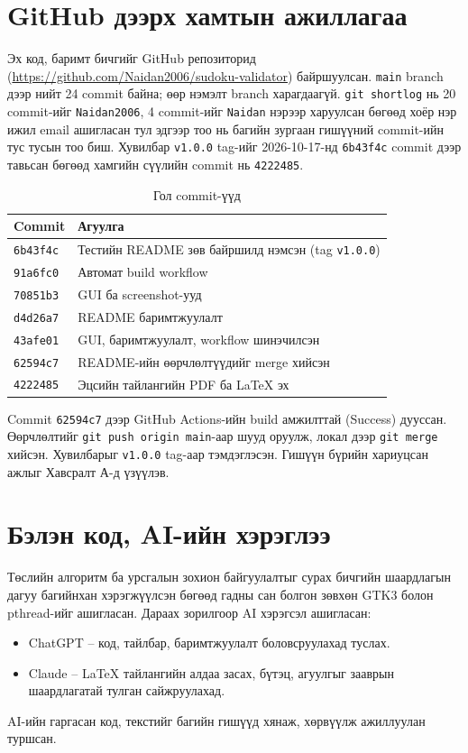 \documentclass[12pt,a4paper]{report}
\newcommand{\repo}{\url{https://github.com/Naidan2006/sudoku-validator}}
\begin{document}
\section{GitHub дээрх хамтын ажиллагаа}
Эх код, баримт бичгийг GitHub репозиторид (\repo) байршуулсан. \texttt{main} branch дээр нийт 24 commit байна; өөр нэмэлт branch харагдаагүй. \texttt{git shortlog} нь 20 commit-ийг \texttt{Naidan2006}, 4 commit-ийг \texttt{Naidan} нэрээр харуулсан бөгөөд хоёр нэр ижил email ашигласан тул эдгээр тоо нь багийн зургаан гишүүний commit-ийн тус тусын тоо биш. Хувилбар \texttt{v1.0.0} tag-ийг 2026-10-17-нд \texttt{6b43f4c} commit дээр тавьсан бөгөөд хамгийн сүүлийн commit нь \texttt{4222485}.
\begin{table}[H]\centering\caption{Гол commit-үүд}\begin{tabular}{P{0.2\textwidth}P{0.65\textwidth}}\toprule
\textbf{Commit}&\textbf{Агуулга}\\\midrule
\texttt{6b43f4c}&Тестийн README зөв байршилд нэмсэн (tag \texttt{v1.0.0})\\
\texttt{91a6fc0}&Автомат build workflow\\
\texttt{70851b3}&GUI ба screenshot-ууд\\
\texttt{d4d26a7}&README баримтжуулалт\\
\texttt{43afe01}&GUI, баримтжуулалт, workflow шинэчилсэн\\
\texttt{62594c7}&README-ийн өөрчлөлтүүдийг merge хийсэн\\
\texttt{4222485}&Эцсийн тайлангийн PDF ба LaTeX эх\\\bottomrule\end{tabular}\end{table}
Commit \texttt{62594c7} дээр GitHub Actions-ийн build амжилттай (Success) дууссан. Өөрчлөлтийг \texttt{git push origin main}-аар шууд оруулж, локал дээр \texttt{git merge} хийсэн. Хувилбарыг \texttt{v1.0.0} tag-аар тэмдэглэсэн. Гишүүн бүрийн хариуцсан ажлыг Хавсралт А-д үзүүлэв.
\section{Бэлэн код, AI-ийн хэрэглээ}
Төслийн алгоритм ба урсгалын зохион байгуулалтыг сурах бичгийн шаардлагын дагуу багийнхан хэрэгжүүлсэн бөгөөд гадны сан болгон зөвхөн GTK3 болон pthread-ийг ашигласан. Дараах зорилгоор AI хэрэгсэл ашигласан:
\begin{itemize}
\item ChatGPT -- код, тайлбар, баримтжуулалт боловсруулахад туслах.
\item Claude -- LaTeX тайлангийн алдаа засах, бүтэц, агуулгыг зааврын шаардлагатай тулган сайжруулахад.
\end{itemize}
AI-ийн гаргасан код, текстийг багийн гишүүд хянаж, хөрвүүлж ажиллуулан туршсан.
\end{document}
